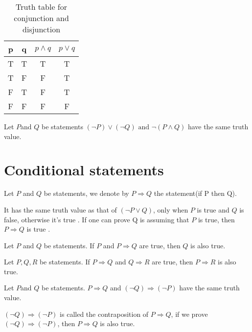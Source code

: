     

\begin{table}
\begin{center}
\begin{tabular}{c|c|c|c}
    p & q & $p\wedge q$ & $p\vee q$ \\
    \hline
    T & T & T & T \\
    T & F & F & T \\
    F & T & F & T \\
    F & F & F & F \\    

\end{tabular}
\caption{Truth table for conjunction and disjunction} 
\end{center}
\end{table}

\begin{propositionenv}
    Let $P$and $Q$ be statements $(\neg P)\vee (\neg Q) \text{ and } \neg(P\wedge Q)$ have the same truth value.
\end{propositionenv}


\section{Conditional statements}
\begin{definitionenv}
    Let $P$ and $Q$ be statements, we denote by $P\Rightarrow Q$ the statement(if P then Q).
\end{definitionenv}
\begin{remark}
    It has the same truth value as that of $(\neg P\vee Q)$, only when $P$ is true and $Q$ is false,  otherwise it's true .
    \newline
    If one can prove Q is assuming that $P$ is true,  then $P\Rightarrow Q$ is true .
\end{remark}
\begin{propositionenv}
    Let $P$ and $Q$ be statements. If $P$ and $P\Rightarrow Q$ are true,  then $Q$ is also true.
\end{propositionenv}
\begin{propositionenv}
    Let $P, Q, R$ be statements. If $P \Rightarrow Q$ and $Q\Rightarrow R$ are true,  then $P\Rightarrow R$ is also true.
\end{propositionenv}
\begin{theoremenv}
    Let $P$and $Q$ be statements. $P\Rightarrow Q$ and $(\neg Q)\Rightarrow (\neg P)$ have the same truth value.
\end{theoremenv}
\begin{box2}
    $(\neg Q)\Rightarrow (\neg P)$ is called the contraposition of $P\Rightarrow Q$,  if we prove $(\neg Q)\Rightarrow (\neg P)$,  then $P\Rightarrow Q$ is also true.
\end{box2}

